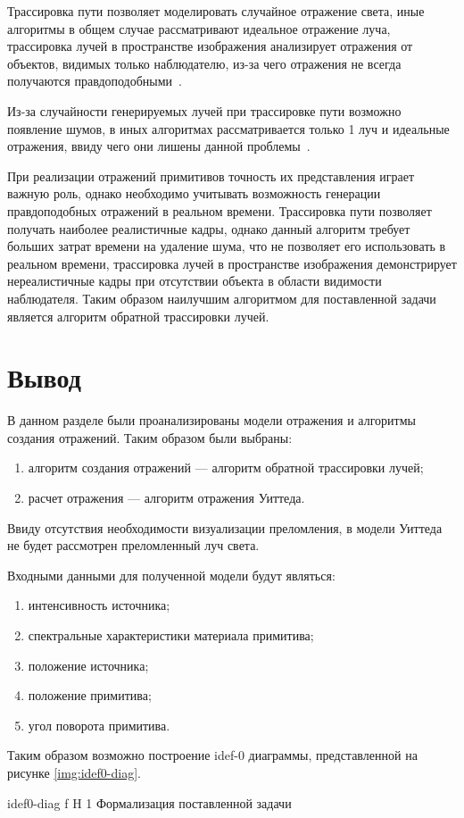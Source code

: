 Трассировка пути позволяет моделировать случайное отражение света, иные алгоритмы в общем случае рассматривают идеальное отражение луча,
трассировка лучей в пространстве изображения анализирует отражения от  объектов, видимых только наблюдателю, из-за чего отражения не всегда получаются правдоподобными~\cite{SSR,path_tracing}.

Из-за случайности генерируемых лучей при трассировке пути возможно появление шумов, в иных алгоритмах рассматривается только 1 луч и идеальные отражения, ввиду чего они лишены данной проблемы~\cite{path_tracing}.




При реализации отражений примитивов точность их представления играет важную роль, однако необходимо учитывать возможность генерации правдоподобных отражений
в реальном времени. Трассировка пути позволяет получать наиболее реалистичные кадры, однако данный алгоритм требует больших затрат времени на удаление шума, что
не позволяет его использовать в реальном времени, трассировка лучей в пространстве изображения демонстрирует нереалистичные кадры при 
отсутствии объекта в области видимости наблюдателя. Таким образом наилучшим алгоритмом для поставленной задачи является алгоритм обратной трассировки лучей.


\section*{Вывод}
В данном разделе были проанализированы модели отражения и алгоритмы создания отражений.
Таким образом были выбраны:
\begin{enumerate}
	\item алгоритм создания отражений --- алгоритм обратной трассировки лучей;
	\item расчет отражения --- алгоритм отражения Уиттеда.
\end{enumerate}
Ввиду отсутствия необходимости визуализации преломления, в модели Уиттеда не будет рассмотрен преломленный луч света.



Входными данными для полученной модели будут являться:
\begin{enumerate}
	\item интенсивность источника;
	\item спектральные характеристики материала примитива;
	\item положение источника;
	\item положение примитива;
	\item угол поворота примитива.
\end{enumerate}

Таким образом возможно построение idef-0 диаграммы, представленной на рисунке \ref{img:idef0-diag}.

{idef0-diag} %
{f} %
{H} %
{1\textwidth} %
{Формализация поставленной задачи} %

